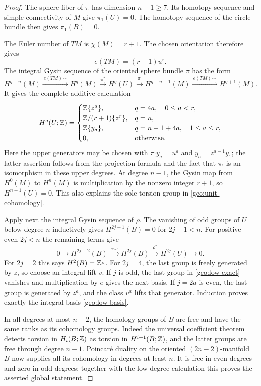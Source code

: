 \begin{proof}
The sphere fiber of $\pi$ has dimension $n-1\ge7$.  Its homotopy
sequence and simple connectivity of $M$ give $\pi_1(U)=0$.
The homotopy sequence of the circle bundle then gives $\pi_1(B)=0$.

The Euler number of $TM$ is $\chi(M)=r+1$.  The chosen orientation
therefore gives
\[
 e(TM)=(r+1)u^r.
\]
The integral Gysin sequence of the oriented sphere bundle $\pi$
has the form
\[
 H^{q-n}(M)\xrightarrow{\ e(TM)\smile\ }H^q(M)
 \xrightarrow{\ \pi^*\ }H^q(U)
 \xrightarrow{\ \pi_!\ }H^{q-n+1}(M)
 \xrightarrow{\ e(TM)\smile\ }H^{q+1}(M).
\]
It gives the complete additive calculation
\begin{equation}\label{geo:unit-cohomology}
 H^q(U;\mathbb Z)=
 \begin{cases}
  \mathbb Z\{z^a\},&q=4a,\quad 0\le a<r,\\
  \mathbb Z/(r+1)\{z^r\},&q=n,\\
  \mathbb Z\{y_a\},&q=n-1+4a,\quad 1\le a\le r,\\
  0,&\text{otherwise}.
 \end{cases}
\end{equation}
Here the upper generators may be chosen with
$\pi_!y_a=u^a$ and $y_a=z^{a-1}y_1$; the latter assertion follows
from the projection formula and the fact that $\pi_!$ is an
isomorphism in these upper degrees.
At degree $n-1$, the Gysin map from $H^0(M)$ to $H^n(M)$ is
multiplication by the nonzero integer $r+1$, so
$H^{n-1}(U)=0$.  This also explains the sole torsion group in
\eqref{geo:unit-cohomology}.

Apply next the integral Gysin sequence of $\rho$.  The vanishing
of odd groups of $U$ below degree $n$ inductively gives
$H^{2j-1}(B)=0$ for $2j-1<n$.  For positive even $2j<n$ the
remaining terms give
\begin{equation}\label{geo:low-exact}
 0\longrightarrow H^{2j-2}(B)
 \xrightarrow{\ e\smile\ }H^{2j}(B)
 \xrightarrow{\ \rho^*\ }H^{2j}(U)
 \longrightarrow0.
\end{equation}
For $2j=2$ this says $H^2(B)=\mathbb Z e$.  For $2j=4$, the last
group is freely generated by $z$, so choose an integral lift $v$.
If $j$ is odd, the last group in \eqref{geo:low-exact} vanishes
and multiplication by $e$ gives the next basis.  If $j=2a$ is
even, the last group is generated by $z^a$, and the class $v^a$
lifts that generator.  Induction proves exactly the integral basis
\eqref{geo:low-basis}.

In all degrees at most $n-2$, the homology groups of $B$ are free
and have the same ranks as its cohomology groups.  Indeed the
universal coefficient theorem detects torsion in $H_i(B;\mathbb Z)$
as torsion in $H^{i+1}(B;\mathbb Z)$, and the latter groups are free
through degree $n-1$.  Poincar\'e duality on the oriented
$(2n-2)$-manifold $B$ now supplies all its cohomology in degrees
at least $n$.  It is free in even degrees and zero in odd degrees;
together with the low-degree calculation this proves the asserted
global statement.


\end{proof}

